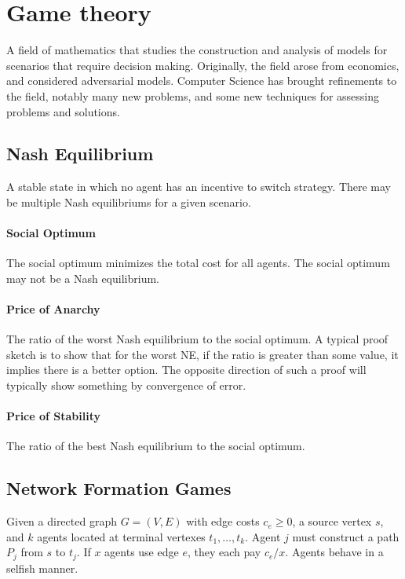 \documentclass{idc_msc}
\begin{document}
\section{Game theory}

A field of mathematics that studies the construction and analysis of models for scenarios that require decision making.
Originally, the field arose from economics, and considered adversarial models.
Computer Science has brought refinements to the field, notably many new problems, and some new techniques for assessing problems and solutions.

\subsection{Nash Equilibrium}

A stable state in which no agent has an incentive to switch strategy.
There may be multiple Nash equilibriums for a given scenario.

\paragraph{Social Optimum}

The social optimum minimizes the total cost for all agents.
The social optimum may not be a Nash equilibrium.

\paragraph{Price of Anarchy}

The ratio of the worst Nash equilibrium to the social optimum.
A typical proof sketch is to show that for the worst NE, if the ratio is greater than some value, it implies there is a better option.
The opposite direction of such a proof will typically show something by convergence of error.

\paragraph{Price of Stability}

The ratio of the best Nash equilibrium to the social optimum.

\subsection{Network Formation Games}

Given a directed graph \(G=(V,E)\) with edge costs \(c_e \ge 0\), a source vertex \(s\), and \(k\) agents located at terminal vertexes \(t_1, \ldots, t_k\).
Agent \(j\) must construct a path \(P_j\) from \(s\) to \(t_j\).
If \(x\) agents use edge \(e\), they each pay \(c_e / x\).
Agents behave in a selfish manner.
\end{document}
